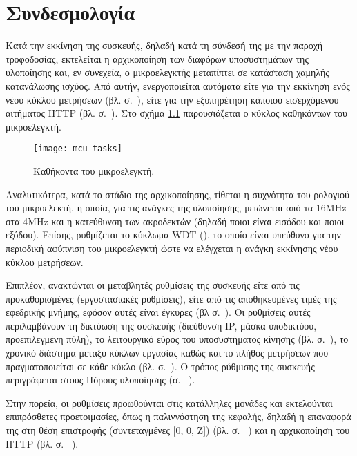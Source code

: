 \chapter{Συνδεσμολογία}

Κατά την εκκίνηση της συσκευής, δηλαδή κατά τη σύνδεσή της με την παροχή
τροφοδοσίας, εκτελείται η αρχικοποίηση των διαφόρων υποσυστημάτων της υλοποίησης
και, εν συνεχεία, ο μικροελεγκτής μεταπίπτει σε κατάσταση χαμηλής κατανάλωσης
ισχύος. Από αυτήν, ενεργοποιείται αυτόματα είτε για την εκκίνηση ενός νέου
κύκλου μετρήσεων (βλ.  σ.~\pageref{sec:task}), είτε για την
εξυπηρέτηση κάποιου εισερχόμενου αιτήματος HTTP (βλ.  σ.~\pageref{sec:network:impl-resources}). Στο σχήμα
\ref{fig:mcu:tasks} παρουσιάζεται ο κύκλος καθηκόντων του μικροελεγκτή.

\begin{figure}
    \caption{Καθήκοντα του μικροελεγκτή.\label{fig:mcu:tasks}}
    \begin{center}
    \texttt{[image: mcu\_tasks]}
    \end{center}
\end{figure}

Αναλυτικότερα, κατά το στάδιο της αρχικοποίησης, τίθεται η συχνότητα του
ρολογιού του μικροελεκτή, η οποία, για τις ανάγκες της υλοποίησης, μειώνεται από
τα 16MHz στα 4MHz και η κατεύθυνση των ακροδεκτών (δηλαδή ποιοι είναι εισόδου
και ποιοι εξόδου). Επίσης, ρυθμίζεται το κύκλωμα WDT (), το
οποίο είναι υπεύθυνο για την περιοδική αφύπνιση του μικροελεγκτή ώστε να
ελέγχεται η ανάγκη εκκίνησης νέου κύκλου μετρήσεων.

Επιπλέον, ανακτώνται οι μεταβλητές ρυθμίσεις της συσκευής είτε από τις
προκαθορισμένες (εργοστασιακές ρυθμίσεις), είτε από τις αποθηκευμένες τιμές της
εφεδρικής μνήμης, εφόσον αυτές είναι έγκυρες (βλ 
σ.~\pageref{subsec:backup-memory}).
Οι ρυθμίσεις αυτές περιλαμβάνουν τη δικτύωση της συσκευής (διεύθυνση IP, μάσκα
υποδικτύου, προεπιλεγμένη πύλη), το λειτουργικό εύρος του υποσυστήματος κίνησης
(βλ.  σ.~\pageref{sec:motor:coordinates}), το
χρονικό διάστημα μεταξύ κύκλων εργασίας καθώς και το πλήθος μετρήσεων που
πραγματοποιείται σε κάθε κύκλο (βλ.  σ.~\pageref{sec:task}).
Ο τρόπος ρύθμισης της συσκευής περιγράφεται στους Πόρους υλοποίησης (σ.~%
\pageref{sec:network:impl-resources}).

Στην πορεία, οι ρυθμίσεις προωθούνται στις κατάλληλες μονάδες και εκτελούνται
επιπρόσθετες προετοιμασίες, όπως η παλιννόστηση της κεφαλής, δηλαδή η επαναφορά
της στη θέση επιστροφής (συντεταγμένες [0, 0, Z]) (βλ. σ.~%
\pageref{sec:motor:homing}) και η αρχικοποίηση του HTTP  (βλ. σ.~%
\pageref{ssubsec:network:port_mr}).


